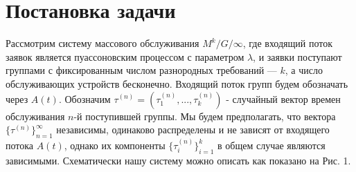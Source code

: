 \documentclass[12pt]{article}
\theoremstyle{plain}
\theoremstyle{definition}
\theoremstyle{remark}
\begin{document}
\newpage

\section{Постановка задачи}

Рассмотрим систему массового обслуживания $M^k/G/\infty$, где входящий поток заявок является пуассоновским процессом с параметром $\lambda$, и заявки поступают группами с фиксированным числом разнородных требований --- $k$, а число обслуживающих устройств бесконечно. Входящий поток групп будем обозначать через $A(t)$. Обозначим $\tau^{(n)}=(\tau_1^{(n)},...,\tau_k^{(n)})$ - случайный вектор времен обслуживания $n$-й поступившей группы. Мы будем предполагать, что вектора $\{\tau^{(n)}\}_{n=1}^{\infty}$ независимы, одинаково распределены и не зависят от входящего потока $A(t)$, однако их компоненты $\{\tau_i^{(n)}\}_{i=1}^k$ в общем случае являются зависимыми. Схематически нашу систему можно описать как показано на Рис. 1.
\end{document}
